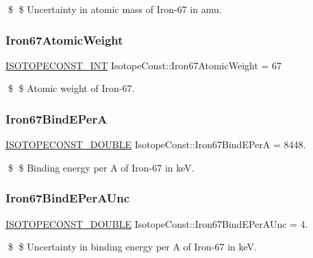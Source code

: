 \$ \$ Uncertainty in atomic mass of Iron-\/67 in amu. \mbox{\label{group___isotope_const-_iron-_fe67_ga9f5e283e902f31cb39ec4d963811831b}} 
\subsubsection{\texorpdfstring{Iron67\+Atomic\+Weight}{Iron67AtomicWeight}}
{\footnotesize\ttfamily \mbox{\hyperlink{group___isotope_const-_macros_ga5f18360b3e99483a35c32d789e62621c}{I\+S\+O\+T\+O\+P\+E\+C\+O\+N\+S\+T\+\_\+\+I\+NT}} Isotope\+Const\+::\+Iron67\+Atomic\+Weight = 67}

\$ \$ Atomic weight of Iron-\/67. \mbox{\label{group___isotope_const-_iron-_fe67_gac4a3b41edec666ba0edec29f855a9517}} 
\subsubsection{\texorpdfstring{Iron67\+Bind\+E\+PerA}{Iron67BindEPerA}}
{\footnotesize\ttfamily \mbox{\hyperlink{group___isotope_const-_macros_ga8f45a7272ce02c0b4c65c44636ed719a}{I\+S\+O\+T\+O\+P\+E\+C\+O\+N\+S\+T\+\_\+\+D\+O\+U\+B\+LE}} Isotope\+Const\+::\+Iron67\+Bind\+E\+PerA = 8448.}

\$ \$ Binding energy per A of Iron-\/67 in keV. \mbox{\label{group___isotope_const-_iron-_fe67_ga9f936bb7bd275f34133c4a6fb771ad4a}} 
\subsubsection{\texorpdfstring{Iron67\+Bind\+E\+Per\+A\+Unc}{Iron67BindEPerAUnc}}
{\footnotesize\ttfamily \mbox{\hyperlink{group___isotope_const-_macros_ga8f45a7272ce02c0b4c65c44636ed719a}{I\+S\+O\+T\+O\+P\+E\+C\+O\+N\+S\+T\+\_\+\+D\+O\+U\+B\+LE}} Isotope\+Const\+::\+Iron67\+Bind\+E\+Per\+A\+Unc = 4.}

\$ \$ Uncertainty in binding energy per A of Iron-\/67 in keV. \mbox{\label{group___isotope_const-_iron-_fe67_ga3c478fc3050d270956f394af8ac315f3}} 
